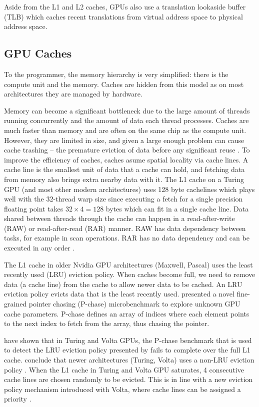 Aside from the L1 and L2 caches, GPUs also use a translation lookaside buffer (TLB) which caches recent translations from virtual address space to physical address space.

\subsection{GPU Caches}
\label{sec:cache_gpu}
To the programmer, the memory hierarchy is very simplified: there is the compute unit and the memory.
Caches are hidden from this model as on most architectures they are managed by hardware.

Memory can become a significant bottleneck due to the large amount of threads running concurrently and the amount of data each thread processes.
Caches are much faster than memory and are often on the same chip as the compute unit.
However, they are limited in size, and given a large enough problem can cause cache trashing -- the premature eviction of data before any significant reuse \cite{dai2016model}.
To improve the efficiency of caches, caches asume spatial locality via cache lines.
A cache line is the smallest unit of data that a cache can hold, and fetching data from memory also brings extra nearby data with it.
The L1 cache on a Turing GPU (and most other modern architectures) uses 128 byte cachelines which plays well with the 32-thread warp size since executing a fetch for a single precision floating point takes $32 \times 4 = 128$ bytes which can fit in a single cache line.
Data shared between threads through the cache can happen in a read-after-write (RAW) or read-after-read (RAR) manner.
RAW has data dependency between tasks, for example in scan operations.
RAR has no data dependency and can be executed in any order \cite{tripathy2021paver}.

The L1 cache in older Nvidia GPU architectures (Maxwell, Pascal) uses the least recently used (LRU) eviction policy.
When caches become full, we need to remove data (a cache line) from the cache to allow newer data to be cached.
An LRU eviction policy evicts data that is the least recently used.
\citet{mei2016dissecting} presented a novel fine-grained pointer chasing (P-chase) microbenchmark to explore unknown GPU cache parameters.
P-chase defines an array of indices where each element points to the next index to fetch from the array, thus chasing the pointer.

\citet{jia2019dissecting} have shown that in Turing and Volta GPUs, the P-chase benchmark that is used to detect the LRU eviction policy presented by \citet{mei2016dissecting} fails to complete over the full L1 cache.
\citeauthor{jia2019dissecting} conclude that newer architectures (Turing, Volta) uses a non-LRU eviction policy \cite{jia2019dissecting, jia2018dissecting,mei2016dissecting}.
When the L1 cache in Turing and Volta GPU saturates, 4 consecutive cache lines are chosen randomly to be evicted.
This is in line with a new eviction policy mechanism introduced with Volta, where cache lines can be assigned a priority \cite{jia2019dissecting,nvidia2021cudadocs}.

